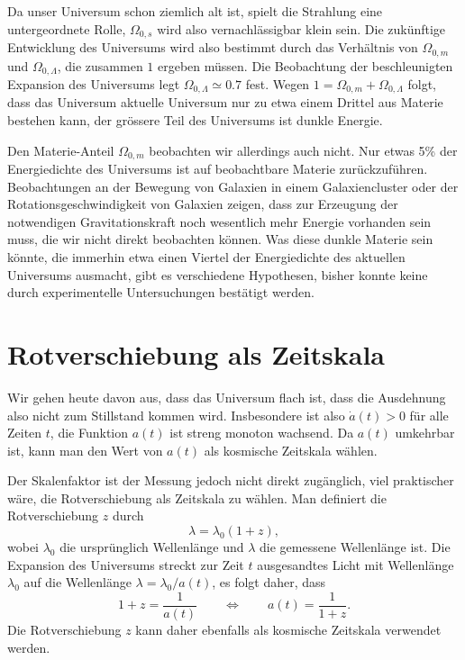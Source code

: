 Da unser Universum schon ziemlich alt ist, spielt die Strahlung
eine untergeordnete Rolle, $\Omega_{0,s}$ wird also vernachlässigbar
klein sein. 
Die zukünftige Entwicklung des Universums wird also bestimmt durch
das Verhältnis von $\Omega_{0,m}$ und $\Omega_{0,\Lambda}$, die
zusammen $1$ ergeben müssen.
Die Beobachtung der beschleunigten Expansion des Universums 
legt $\Omega_{0,\Lambda}\simeq 0.7$ fest.
Wegen $1=\Omega_{0,m}+\Omega_{0,\Lambda}$ folgt, dass das
Universum aktuelle Universum nur zu etwa einem Drittel aus 
Materie bestehen kann, der grössere Teil des Universums ist
dunkle Energie.

Den Materie-Anteil $\Omega_{0,m}$ beobachten wir allerdings auch
nicht.
Nur etwas 5\% der Energiedichte des Universums ist auf beobachtbare
Materie zurückzuführen.
Beobachtungen an der Bewegung von Galaxien in einem Galaxiencluster
oder der Rotationsgeschwindigkeit von Galaxien zeigen, dass zur Erzeugung
der notwendigen Gravitationskraft noch wesentlich mehr Energie vorhanden
sein muss, die wir nicht direkt beobachten können.
Was diese dunkle Materie sein könnte, die immerhin etwa einen Viertel der
Energiedichte des aktuellen Universums ausmacht, gibt es verschiedene
Hypothesen, bisher konnte keine durch experimentelle Untersuchungen
bestätigt werden.

\section{Rotverschiebung als Zeitskala%
\label{skript:section:rotverschiebung}}
Wir gehen heute davon aus, dass das Universum flach ist, dass die
Ausdehnung also nicht zum Stillstand kommen wird.
Insbesondere ist also $\dot a(t)>0$ für alle Zeiten $t$, die Funktion
$a(t)$ ist streng monoton wachsend.
Da $a(t)$ umkehrbar ist, kann man den Wert von $a(t)$ als kosmische
Zeitskala wählen.


Der Skalenfaktor ist der Messung jedoch nicht direkt zugänglich,
viel praktischer wäre, die Rotverschiebung als Zeitskala zu wählen.
Man definiert die Rotverschiebung $z$ durch
\[
\lambda = \lambda_0(1+z),
\]
wobei $\lambda_0$ die ursprünglich Wellenlänge und $\lambda$ die
gemessene Wellenlänge ist.
Die Expansion des Universums streckt zur Zeit $t$ ausgesandtes Licht mit
Wellenlänge $\lambda_0$ auf die Wellenlänge $\lambda=\lambda_0/a(t)$,
es folgt daher, dass
\[
1+z=\frac{1}{a(t)}
\qquad\Leftrightarrow\qquad
a(t)=\frac1{1+z}.
\]
Die Rotverschiebung $z$ kann daher ebenfalls als kosmische Zeitskala 
verwendet werden.

